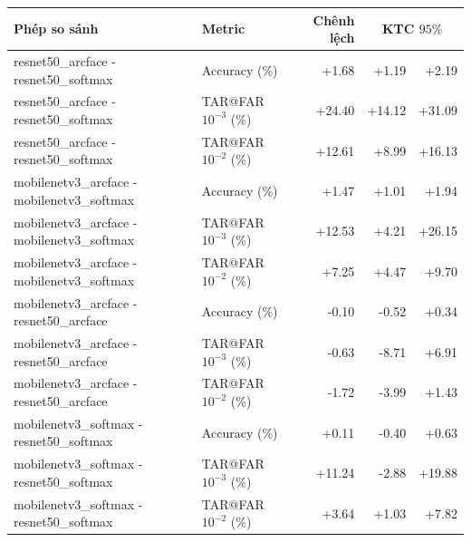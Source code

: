 \begin{tabular}{llrrr}
\toprule
Phép so sánh & Metric & Chênh lệch & \multicolumn{2}{c}{KTC $95\%$} \\
\midrule
resnet50\_arcface - resnet50\_softmax & Accuracy (\%) & +1.68 & +1.19 & +2.19 \\
resnet50\_arcface - resnet50\_softmax & TAR@FAR $10^{-3}$ (\%) & +24.40 & +14.12 & +31.09 \\
resnet50\_arcface - resnet50\_softmax & TAR@FAR $10^{-2}$ (\%) & +12.61 & +8.99 & +16.13 \\
mobilenetv3\_arcface - mobilenetv3\_softmax & Accuracy (\%) & +1.47 & +1.01 & +1.94 \\
mobilenetv3\_arcface - mobilenetv3\_softmax & TAR@FAR $10^{-3}$ (\%) & +12.53 & +4.21 & +26.15 \\
mobilenetv3\_arcface - mobilenetv3\_softmax & TAR@FAR $10^{-2}$ (\%) & +7.25 & +4.47 & +9.70 \\
mobilenetv3\_arcface - resnet50\_arcface & Accuracy (\%) & -0.10 & -0.52 & +0.34 \\
mobilenetv3\_arcface - resnet50\_arcface & TAR@FAR $10^{-3}$ (\%) & -0.63 & -8.71 & +6.91 \\
mobilenetv3\_arcface - resnet50\_arcface & TAR@FAR $10^{-2}$ (\%) & -1.72 & -3.99 & +1.43 \\
mobilenetv3\_softmax - resnet50\_softmax & Accuracy (\%) & +0.11 & -0.40 & +0.63 \\
mobilenetv3\_softmax - resnet50\_softmax & TAR@FAR $10^{-3}$ (\%) & +11.24 & -2.88 & +19.88 \\
mobilenetv3\_softmax - resnet50\_softmax & TAR@FAR $10^{-2}$ (\%) & +3.64 & +1.03 & +7.82 \\
\bottomrule
\end{tabular}
